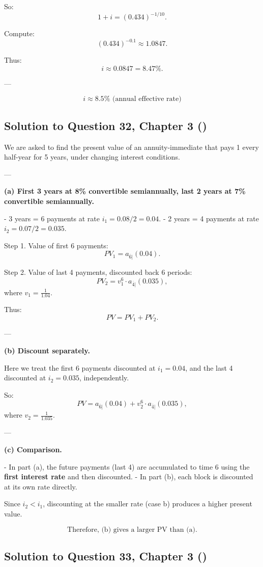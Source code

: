 \documentclass[12pt, a4paper]{article}
\begin{document}
{So:
\[
1+i = (0.434)^{-1/10}.
\]

Compute:
\[
(0.434)^{-0.1} \approx 1.0847.
\]

Thus:
\[
i \approx 0.0847 = 8.47\%.
\]

---

\[
\boxed{i \approx 8.5\% \text{ (annual effective rate)}}
\]

\subsection*{Solution to Question 32, Chapter 3 (\cite{toi3rd})}

We are asked to find the present value of an annuity-immediate that pays 1 every half-year for 5 years, under changing interest conditions.

---

\textbf{(a) First 3 years at 8\% convertible semiannually, last 2 years at 7\% convertible semiannually.}

- 3 years = 6 payments at rate $i_1 = 0.08/2 = 0.04$.  
- 2 years = 4 payments at rate $i_2 = 0.07/2 = 0.035$.  

Step 1. Value of first 6 payments:  
\[
PV_1 = a_{\overline{6}|}(0.04).
\]

Step 2. Value of last 4 payments, discounted back 6 periods:  
\[
PV_2 = v_1^6 \cdot a_{\overline{4}|}(0.035),
\]
where $v_1 = \frac{1}{1.04}$.

Thus:
\[
PV = PV_1 + PV_2.
\]

---

\textbf{(b) Discount separately.}

Here we treat the first 6 payments discounted at $i_1 = 0.04$, and the last 4 discounted at $i_2 = 0.035$, independently.  

So:
\[
PV = a_{\overline{6}|}(0.04) + v_2^6 \cdot a_{\overline{4}|}(0.035),
\]
where $v_2 = \frac{1}{1.035}$.

---

\textbf{(c) Comparison.}

- In part (a), the future payments (last 4) are accumulated to time 6 using the \textbf{first interest rate} and then discounted.  
- In part (b), each block is discounted at its own rate directly.  

Since $i_2 < i_1$, discounting at the smaller rate (case b) produces a higher present value.  

\[
\boxed{\text{Therefore, (b) gives a larger PV than (a).}}
\]

\subsection*{Solution to Question 33, Chapter 3 (\cite{toi3rd})}

}
\end{document}
